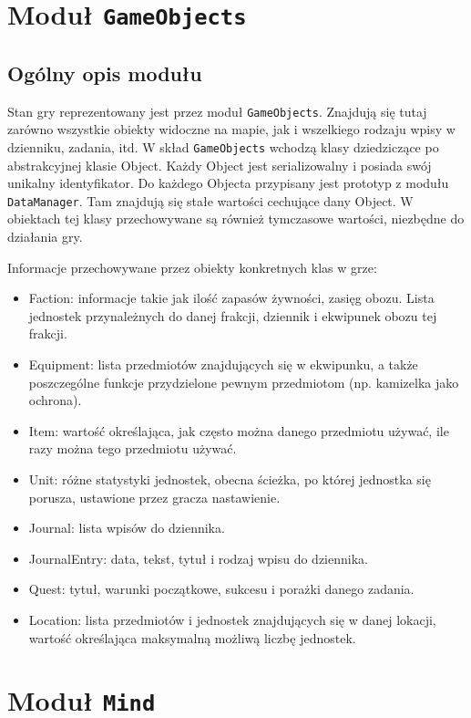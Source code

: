 \documentclass[licencjacka]{pracamgr}
\begin{document}
  \section{Moduł \texttt{GameObjects}}
    \subsection{Ogólny opis modułu}
      Stan gry reprezentowany jest przez moduł \texttt{GameObjects}. Znajdują się tutaj zarówno wszystkie obiekty widoczne na
      mapie, jak i wszelkiego rodzaju wpisy w dzienniku, zadania, itd. W skład \texttt{GameObjects} wchodzą klasy
      dziedziczące po abstrakcyjnej klasie Object. Każdy Object jest serializowalny i posiada swój unikalny
      identyfikator. Do każdego Objecta przypisany jest prototyp z modułu \texttt{DataManager}. Tam znajdują się stałe
      wartości cechujące dany Object. W obiektach tej klasy przechowywane są również tymczasowe wartości, niezbędne
      do działania gry.

      Informacje przechowywane przez obiekty konkretnych klas w grze:
      \begin{itemize}
        \item Faction: informacje takie jak ilość zapasów żywności, zasięg obozu. Lista jednostek przynależnych do danej
          frakcji, dziennik i ekwipunek obozu tej frakcji.
        \item Equipment: lista przedmiotów znajdujących się w ekwipunku, a także poszczególne funkcje przydzielone
          pewnym przedmiotom (np. kamizelka jako ochrona).
        \item Item: wartość określająca, jak często można danego przedmiotu używać, ile razy można tego przedmiotu używać.
        \item Unit: różne statystyki jednostek, obecna ścieżka, po której jednostka się porusza, ustawione przez gracza
          nastawienie.
        \item Journal: lista wpisów do dziennika.
        \item JournalEntry: data, tekst, tytuł i rodzaj wpisu do dziennika.
        \item Quest: tytuł, warunki początkowe, sukcesu i porażki danego zadania.
        \item Location: lista przedmiotów i jednostek znajdujących się w danej lokacji, wartość określająca maksymalną
          możliwą liczbę jednostek.
      \end{itemize}

  \section{Moduł \texttt{Mind}}
\end{document}
